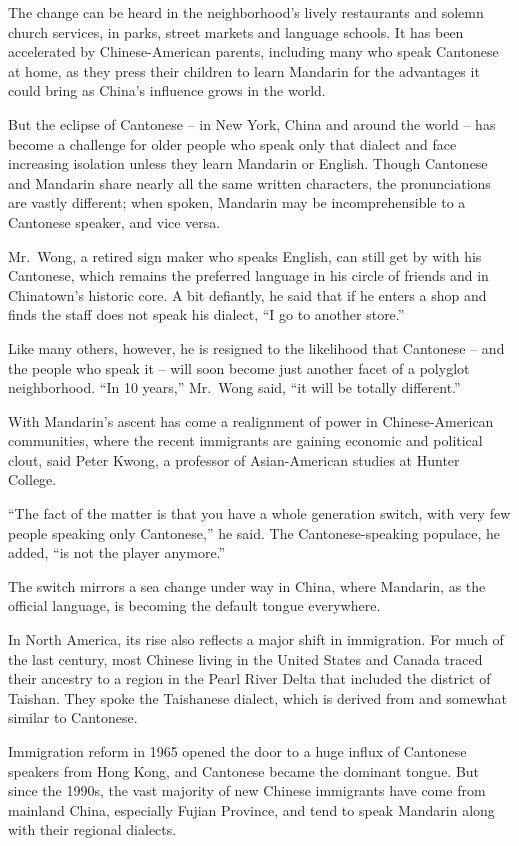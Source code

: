 ﻿\documentclass[12pt]{article}
\begin{document}
The change can be heard in the neighborhood's lively restaurants and solemn church services, in
parks, street markets and language schools. It has been accelerated by Chinese-American parents,
including many who speak Cantonese at home, as they press their children to learn Mandarin for the
advantages it could bring as China's influence grows in the world.

But the eclipse of Cantonese -- in New York, China and around the world -- has become a challenge
for older people who speak only that dialect and face increasing isolation unless they learn
Mandarin or English. Though Cantonese and Mandarin share nearly all the same written characters, the
pronunciations are vastly different; when spoken, Mandarin may be incomprehensible to a Cantonese
speaker, and vice versa.

Mr.~Wong, a retired sign maker who speaks English, can still get by with his Cantonese, which
remains the preferred language in his circle of friends and in Chinatown's historic core. A bit
defiantly, he said that if he enters a shop and finds the staff does not speak his dialect, ``I go
to another store.''

Like many others, however, he is resigned to the likelihood that Cantonese -- and the people who
speak it -- will soon become just another facet of a polyglot neighborhood. ``In 10 years,''
Mr.~Wong said, ``it will be totally different.''

With Mandarin's ascent has come a realignment of power in Chinese-American communities, where the
recent immigrants are gaining economic and political clout, said Peter Kwong, a professor of
Asian-American studies at Hunter College.

``The fact of the matter is that you have a whole generation switch, with very few people speaking
only Cantonese,'' he said. The Cantonese-speaking populace, he added, ``is not the player anymore.''

The switch mirrors a sea change under way in China, where Mandarin, as the official language, is
becoming the default tongue everywhere.

In North America, its rise also reflects a major shift in immigration. For much of the last century,
most Chinese living in the United States and Canada traced their ancestry to a region in the Pearl
River Delta that included the district of Taishan. They spoke the Taishanese dialect, which is
derived from and somewhat similar to Cantonese.

Immigration reform in 1965 opened the door to a huge influx of Cantonese speakers from Hong Kong,
and Cantonese became the dominant tongue. But since the 1990s, the vast majority of new Chinese
immigrants have come from mainland China, especially Fujian Province, and tend to speak Mandarin
along with their regional dialects.
\end{document}
